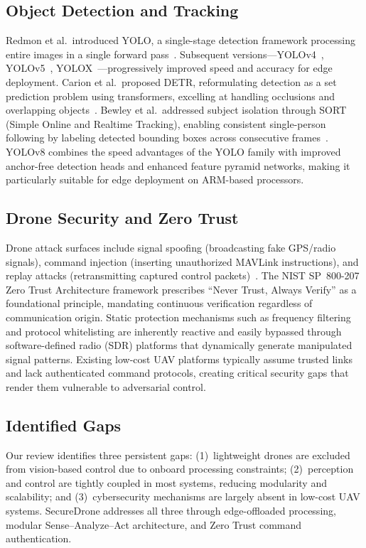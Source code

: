 \documentclass[conference]{IEEEtran}
\begin{document}
\subsection{Object Detection and Tracking}

Redmon et al.\ introduced YOLO, a single-stage detection framework processing entire images in a single forward pass~\cite{redmon2018}. Subsequent versions---YOLOv4~\cite{bochkovskiy2020}, YOLOv5~\cite{jocher2020}, YOLOX~\cite{ge2021}---progressively improved speed and accuracy for edge deployment. Carion et al.\ proposed DETR, reformulating detection as a set prediction problem using transformers, excelling at handling occlusions and overlapping objects~\cite{chen2016}. Bewley et al.\ addressed subject isolation through SORT (Simple Online and Realtime Tracking), enabling consistent single-person following by labeling detected bounding boxes across consecutive frames~\cite{everingham2010}. YOLOv8 combines the speed advantages of the YOLO family with improved anchor-free detection heads and enhanced feature pyramid networks, making it particularly suitable for edge deployment on ARM-based processors.

\subsection{Drone Security and Zero Trust}

Drone attack surfaces include signal spoofing (broadcasting fake GPS/radio signals), command injection (inserting unauthorized MAVLink instructions), and replay attacks (retransmitting captured control packets)~\cite{nist_zt}. The NIST SP~800-207 Zero Trust Architecture framework prescribes ``Never Trust, Always Verify'' as a foundational principle, mandating continuous verification regardless of communication origin. Static protection mechanisms such as frequency filtering and protocol whitelisting are inherently reactive and easily bypassed through software-defined radio (SDR) platforms that dynamically generate manipulated signal patterns. Existing low-cost UAV platforms typically assume trusted links and lack authenticated command protocols, creating critical security gaps that render them vulnerable to adversarial control.

\subsection{Identified Gaps}

Our review identifies three persistent gaps: (1)~lightweight drones are excluded from vision-based control due to onboard processing constraints; (2)~perception and control are tightly coupled in most systems, reducing modularity and scalability; and (3)~cybersecurity mechanisms are largely absent in low-cost UAV systems. SecureDrone addresses all three through edge-offloaded processing, modular Sense--Analyze--Act architecture, and Zero Trust command authentication.
\end{document}
